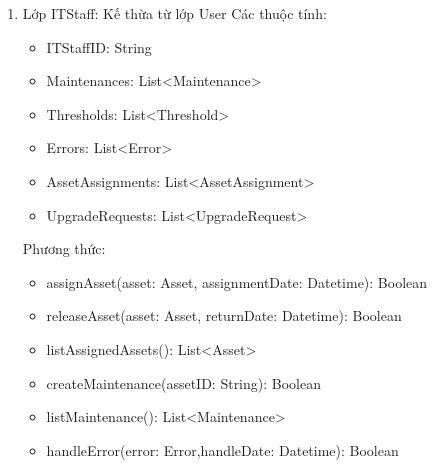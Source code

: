 \begin{enumerate}
\begin{itemize}[label=--]
        \item ManagerID : String (Public)
        \item PurchaseOrders: List<PurchaseOrder> (Public)
        \item UpgradeRequests: List<UpgradeRequest> (Public)
    \end{itemize}
    Phương thức:
    \begin{itemize}[label=--]
        \item createPurchaseOrder(): Boolean
        \item removePurchaseOrder(): Boolean
        \item approveUpgradeRequest(UpgradeRequest):Boolean
        \item getSupplierInfo(): List<Supplier>
    \end{itemize}
    Mối quan hệ tham gia:
    \begin{itemize}[label=--]
        \item Association với lớp UpgradeRequest
        \item Composition với lớp PurchaseOrder
    \end{itemize}
    \item Lớp ITStaff: Kế thừa từ lớp User
    Các thuộc tính:
    \begin{itemize}[label=--]
        \item ITStaffID: String
        \item Maintenances: List<Maintenance>
        \item Thresholds: List<Threshold>
        \item Errors: List<Error>
        \item AssetAssignments: List<AssetAssignment>
        \item UpgradeRequests: List<UpgradeRequest>
    \end{itemize}
    Phương thức:
    \begin{itemize}[label=--]
        \item assignAsset(asset: Asset, assignmentDate: Datetime): Boolean
        \item releaseAsset(asset: Asset, returnDate: Datetime): Boolean
        \item listAssignedAssets(): List<Asset>
        \item createMaintenance(assetID: String): Boolean
        \item listMaintenance(): List<Maintenance>
        \item handleError(error: Error,handleDate: Datetime): Boolean

\end{itemize}
\end{enumerate}
